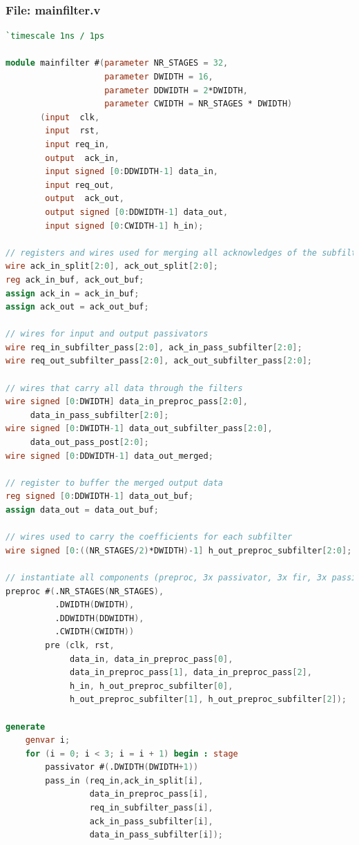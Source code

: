 \documentclass[a4paper,twoside,11pt, fleqn]{article}
\begin{document}
\subsubsection{File: mainfilter.v}
\begin{lstlisting}[language=Verilog]
`timescale 1ns / 1ps

module mainfilter #(parameter NR_STAGES = 32,
                    parameter DWIDTH = 16,
                    parameter DDWIDTH = 2*DWIDTH,
                    parameter CWIDTH = NR_STAGES * DWIDTH)
       (input  clk,
        input  rst,
        input req_in,
        output  ack_in,
        input signed [0:DDWIDTH-1] data_in,
        input req_out,
        output  ack_out,
        output signed [0:DDWIDTH-1] data_out,
        input signed [0:CWIDTH-1] h_in);

// registers and wires used for merging all acknowledges of the subfilters
wire ack_in_split[2:0], ack_out_split[2:0];
reg ack_in_buf, ack_out_buf;
assign ack_in = ack_in_buf;
assign ack_out = ack_out_buf;

// wires for input and output passivators
wire req_in_subfilter_pass[2:0], ack_in_pass_subfilter[2:0];
wire req_out_subfilter_pass[2:0], ack_out_subfilter_pass[2:0];

// wires that carry all data through the filters
wire signed [0:DWIDTH] data_in_preproc_pass[2:0],
     data_in_pass_subfilter[2:0];
wire signed [0:DWIDTH-1] data_out_subfilter_pass[2:0],
     data_out_pass_post[2:0];
wire signed [0:DDWIDTH-1] data_out_merged;

// register to buffer the merged output data
reg signed [0:DDWIDTH-1] data_out_buf;
assign data_out = data_out_buf;

// wires used to carry the coefficients for each subfilter
wire signed [0:((NR_STAGES/2)*DWIDTH)-1] h_out_preproc_subfilter[2:0];

// instantiate all components (preproc, 3x passivator, 3x fir, 3x passivator, postproc)
preproc #(.NR_STAGES(NR_STAGES),
		  .DWIDTH(DWIDTH),
		  .DDWIDTH(DDWIDTH),
		  .CWIDTH(CWIDTH))
        pre (clk, rst,
             data_in, data_in_preproc_pass[0],
             data_in_preproc_pass[1], data_in_preproc_pass[2],
             h_in, h_out_preproc_subfilter[0],
             h_out_preproc_subfilter[1], h_out_preproc_subfilter[2]);

generate
    genvar i;
	for (i = 0; i < 3; i = i + 1) begin : stage
    	passivator #(.DWIDTH(DWIDTH+1))
        pass_in (req_in,ack_in_split[i],
                 data_in_preproc_pass[i],
                 req_in_subfilter_pass[i],
                 ack_in_pass_subfilter[i],
                 data_in_pass_subfilter[i]);


\end{lstlisting}
\end{document}
